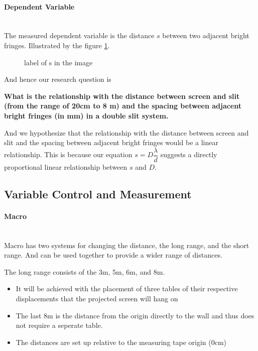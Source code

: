 \documentclass[12pt]{article}
\begin{document}
\paragraph{Dependent Variable}\leavevmode\\
The measured dependent variable is the distance $s$ between two adjacent bright fringes. Illustrated by the figure \ref{fig:S illustration}.
\begin{figure}[htbp]
    \center
    
    \caption{label of s in the image}
    \label{fig:S illustration}
\end{figure}
\par
And hence our research question is
\par
\begin{center}
    \begin{minipage}{0.8\textwidth}
        \centering
        \textbf{What is the relationship with the distance between screen and slit (from the range of 20cm to 8 m) and the spacing between adjacent bright fringes (in mm) in a double slit system.}
    \end{minipage}
\end{center}
\par
And we hypothesize that the relationship with the distance between screen and slit and the spacing between adjacent bright fringes would be a linear relationship. This is because our equation $s= D\dfrac{\lambda}{d}$ suggests a directly proportional linear relationship between $s$ and $D$.
\pagebreak

\subsection{Variable Control and Measurement}
\paragraph{Macro}\leavevmode\\
Macro has two systems for changing the distance, the long range, and the short range. And can be used together to provide a wider range of distances.

The long range consists of the 3m, 5m, 6m, and 8m. 

\begin{itemize}
    \item It will be achieved with the placement of three tables of their respective displacements that the projected screen will hang on
    \item The last 8m is the distance from the origin directly to the wall and thus does not require a seperate table.
    \item The distances are set up relative to the measuring tape origin (0cm)
\end{itemize}
\end{document}
